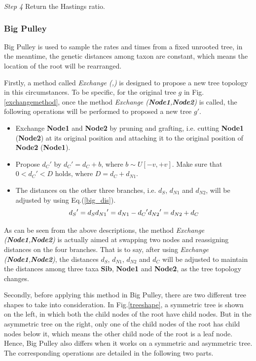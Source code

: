 \documentclass{bmcart}
\begin{document}
\emph{Step 4} Return the Hastings ratio.
\subsubsection*{Big Pulley}
Big Pulley is used to sample the rates and times from a fixed unrooted tree, in the meantime, the genetic distances among taxon are constant, which means the location of the root will be rearranged.

Firstly, a method called \textit{Exchange (,)} is designed to propose a new tree topology in this circumstances. To be specific, for the original tree $g$ in Fig.\ref{exchangemethod}, once the method \textit{Exchange (\textbf{Node1},\textbf{Node2})} is called, the following operations will be performed to proposed a new tree $g'$.
\begin{itemize}
\item Exchange \textbf{Node1} and \textbf{Node2} by pruning and grafting, i.e. cutting \textbf{Node1} (\textbf{Node2}) at its original position and attaching it to the original position of \textbf{Node2} (\textbf{Node1}).
\item Propose ${d_C}'$ by ${d_C}' = {d_C} + b$, where $b \sim U[ - v, + v]$. Make sure that $0 < {d_C}' < D$ holds, where $D = {d_C} + {d_{N1}}$.
\item The distances on the other three branches, i.e. $d_S$, $d_{N1}$ and $d_{N2}$, will be adjusted by using Eq.(\ref{big_dis}).
\begin{equation}\label{big_dis}
{d_S}' = {d_S}\\
{d_{N1}}' = {d_{N1}} - {d_C}'\\
{d_{N2}}' = {d_{N2}} + {d_C}
\end{equation}
\end{itemize}

As can be seen from the above descriptions, the method \textit{Exchange (\textbf{Node1},\textbf{Node2})} is actually aimed at swapping two nodes and reassigning distances on the four branches. That is to say, after using \textit{Exchange (\textbf{Node1},\textbf{Node2})}, the distances $d_S$, $d_{N1}$, $d_{N2}$ and $d_{C}$ will be adjusted to maintain the distances among three taxa \textbf{Sib}, \textbf{Node1} and \textbf{Node2}, as the tree topology changes. 

Secondly, before applying this method in Big Pulley, there are two different tree shapes to take into consideration. In Fig.\ref{treeshape}, a symmetric tree is shown on the left, in which both the child nodes of the root have child nodes. But in the asymmetric tree on the right, only one of the child nodes of the root has child nodes below it, which means the other child node of the root is a leaf node. Hence, Big Pulley also differs when it works on a symmetric and asymmetric tree. The corresponding operations are detailed in the following two parts.
\end{document}
